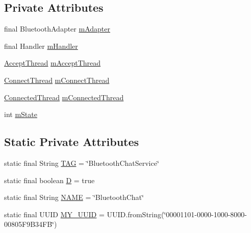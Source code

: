 \subsection*{Private Attributes}
\begin{DoxyCompactItemize}
\item 
final Bluetooth\-Adapter \hyperlink{classcom_1_1example_1_1android_1_1_bluetooth_chat_1_1_bluetooth_chat_service_ad0137191bfc9f5f84d692c5179046dac}{m\-Adapter}
\item 
final Handler \hyperlink{classcom_1_1example_1_1android_1_1_bluetooth_chat_1_1_bluetooth_chat_service_ac596631c3faeaba71c591b7d6232c489}{m\-Handler}
\item 
\hyperlink{classcom_1_1example_1_1android_1_1_bluetooth_chat_1_1_bluetooth_chat_service_1_1_accept_thread}{Accept\-Thread} \hyperlink{classcom_1_1example_1_1android_1_1_bluetooth_chat_1_1_bluetooth_chat_service_a5e8a8695cae6c6a842646ec72feb30d7}{m\-Accept\-Thread}
\item 
\hyperlink{classcom_1_1example_1_1android_1_1_bluetooth_chat_1_1_bluetooth_chat_service_1_1_connect_thread}{Connect\-Thread} \hyperlink{classcom_1_1example_1_1android_1_1_bluetooth_chat_1_1_bluetooth_chat_service_a329b61002394a1b98ae8366549c3f4e8}{m\-Connect\-Thread}
\item 
\hyperlink{classcom_1_1example_1_1android_1_1_bluetooth_chat_1_1_bluetooth_chat_service_1_1_connected_thread}{Connected\-Thread} \hyperlink{classcom_1_1example_1_1android_1_1_bluetooth_chat_1_1_bluetooth_chat_service_a35e6f3f781880c30d3fffef2e408d367}{m\-Connected\-Thread}
\item 
int \hyperlink{classcom_1_1example_1_1android_1_1_bluetooth_chat_1_1_bluetooth_chat_service_a9170ea7c3cb727e1c86da45a7ed88a54}{m\-State}
\end{DoxyCompactItemize}
\subsection*{Static Private Attributes}
\begin{DoxyCompactItemize}
\item 
static final String \hyperlink{classcom_1_1example_1_1android_1_1_bluetooth_chat_1_1_bluetooth_chat_service_a844c5efdea72aa6bf76fb98b1072572a}{T\-A\-G} = \char`\"{}Bluetooth\-Chat\-Service\char`\"{}
\item 
static final boolean \hyperlink{classcom_1_1example_1_1android_1_1_bluetooth_chat_1_1_bluetooth_chat_service_a5d04bb9010fad999fbcad7c652d6c0ce}{D} = true
\item 
static final String \hyperlink{classcom_1_1example_1_1android_1_1_bluetooth_chat_1_1_bluetooth_chat_service_a2e2a8b5e4b33363e36e2d75ff425c86c}{N\-A\-M\-E} = \char`\"{}Bluetooth\-Chat\char`\"{}
\item 
static final U\-U\-I\-D \hyperlink{classcom_1_1example_1_1android_1_1_bluetooth_chat_1_1_bluetooth_chat_service_ad6683c9b25da0fe7ea60ab048c7589cb}{M\-Y\-\_\-\-U\-U\-I\-D} = U\-U\-I\-D.\-from\-String(\char`\"{}00001101-\/0000-\/1000-\/8000-\/00805\-F9\-B34\-F\-B\char`\"{})
\end{DoxyCompactItemize}


